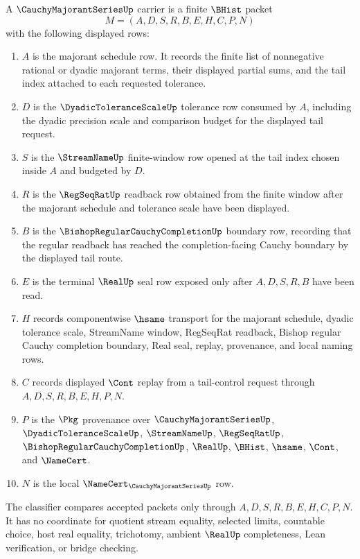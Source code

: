 \begin{definition}
\label{def:cauchy-majorant-series-carrier}
A $\CauchyMajorantSeriesUp$ carrier is a finite $\BHist$ packet
$$
M=(A,D,S,R,B,E,H,C,P,N)
$$
with the following displayed rows:
\begin{enumerate}
\item $A$ is the majorant schedule row. It records the finite list of nonnegative rational or dyadic majorant terms, their displayed partial sums, and the tail index attached to each requested tolerance.
\item $D$ is the $\DyadicToleranceScaleUp$ tolerance row consumed by $A$, including the dyadic precision scale and comparison budget for the displayed tail request.
\item $S$ is the $\StreamNameUp$ finite-window row opened at the tail index chosen inside $A$ and budgeted by $D$.
\item $R$ is the $\RegSeqRatUp$ readback row obtained from the finite window after the majorant schedule and tolerance scale have been displayed.
\item $B$ is the $\BishopRegularCauchyCompletionUp$ boundary row, recording that the regular readback has reached the completion-facing Cauchy boundary by the displayed tail route.
\item $E$ is the terminal $\RealUp$ seal row exposed only after $A,D,S,R,B$ have been read.
\item $H$ records componentwise $\hsame$ transport for the majorant schedule, dyadic tolerance scale, StreamName window, RegSeqRat readback, Bishop regular Cauchy completion boundary, Real seal, replay, provenance, and local naming rows.
\item $C$ records displayed $\Cont$ replay from a tail-control request through $A,D,S,R,B,E,H,P,N$.
\item $P$ is the $\Pkg$ provenance over $\CauchyMajorantSeriesUp$, $\DyadicToleranceScaleUp$, $\StreamNameUp$, $\RegSeqRatUp$, $\BishopRegularCauchyCompletionUp$, $\RealUp$, $\BHist$, $\hsame$, $\Cont$, and $\NameCert$.
\item $N$ is the local $\NameCert_{\CauchyMajorantSeriesUp}$ row.
\end{enumerate}
The classifier compares accepted packets only through $A,D,S,R,B,E,H,C,P,N$. It has no coordinate for quotient stream equality, selected limits, countable choice, host real equality, trichotomy, ambient $\RealUp$ completeness, Lean verification, or bridge checking.
\end{definition}

